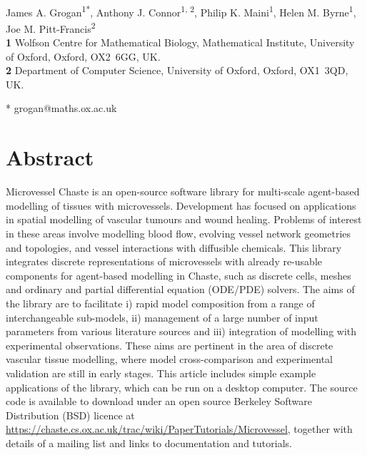 \documentclass[10pt,letterpaper]{article}
\date{}
\begin{document}
\vspace*{0.2in}

\begin{flushleft}
{\Large
\textbf{} %
}
\newline
\\
James A. Grogan\textsuperscript{1*},
Anthony J. Connor\textsuperscript{1, 2},
Philip K. Maini\textsuperscript{1},
Helen M. Byrne\textsuperscript{1},
Joe M. Pitt-Francis\textsuperscript{2}
\\
\bigskip
\textbf{1} Wolfson Centre for Mathematical Biology, Mathematical Institute, University of Oxford, Oxford, \mbox{OX2 6GG}, UK.
\\
\textbf{2} Department of Computer Science, University of Oxford, Oxford, \mbox{OX1 3QD}, UK.
\\
\bigskip

* grogan@maths.ox.ac.uk

\end{flushleft}

\section*{Abstract}
Microvessel Chaste is an open-source software library for multi-scale agent-based modelling of tissues with microvessels. Development has focused on applications in spatial modelling of vascular tumours and wound healing. Problems of interest in these areas involve modelling blood flow, evolving vessel network geometries and topologies, and vessel interactions with diffusible chemicals. This library integrates discrete representations of microvessels with already re-usable components for agent-based modelling in Chaste, such as discrete cells, meshes and ordinary and partial differential equation (ODE/PDE) solvers. The aims of the library are to facilitate i) rapid model composition from a range of interchangeable sub-models, ii) management of a large number of input parameters from various literature sources and iii) integration of modelling with experimental observations. These aims are pertinent in the area of discrete vascular tissue modelling, where model cross-comparison and experimental validation are still in early stages. This article includes simple example applications of the library, which can be run on a desktop computer. The source code is available to download under an open source Berkeley Software Distribution (BSD) licence at \url{https://chaste.cs.ox.ac.uk/trac/wiki/PaperTutorials/Microvessel}, together with details of a mailing list and links to documentation and tutorials.
\end{document}
